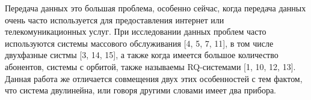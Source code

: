 
	Передача данных это большая проблема, особенно сейчас, когда передача данных очень часто используется для предоставления интернет или телекомуникационных услуг. При исследовании данных проблем часто используются системы массового обслуживания [4, 5, 7, 11], в том числе двухфазные систмы [3, 14, 15], а также когда имеется большое количество абонентов, системы с орбитой, также называемы RQ-системами [1, 10, 12, 13]. Данная работа же отличается совмещения двух этих особенностей с тем фактом, что система двулинейна, или говоря другими словами имеет два прибора.
	